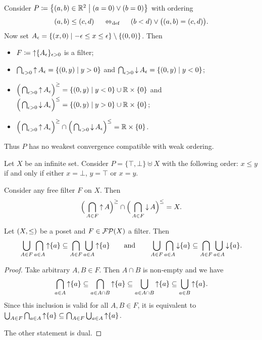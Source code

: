 \begin{example}
Consider $P \defeq \setbuilder{(a,b)\in \R^2}{(a=0)\lor (b=0)}$ with ordering
\[ (a,b) \leq (c,d) \;\quad\Leftrightarrow_{\text{def}}\quad\; (b<d) \lor \big((a,b) = (c,d)\big). \]
Now set $A_\epsilon = \setbuilder{(x, 0)}{-\epsilon \leq x\leq \epsilon} \setminus\{(0,0)\}$. Then
\begin{itemize}
\item $F \coloneqq \operatorname{\uparrow} \{A_\epsilon\}_{\epsilon > 0}$ is a filter;
\item $\bigcap_{\epsilon > 0}\upset A_\epsilon = \setbuilder{(0,y)}{y > 0}$ and $\bigcap_{\epsilon > 0}\downset A_\epsilon = \setbuilder{(0,y)}{y < 0}$;
\item $\Big(\bigcap_{\epsilon > 0}\upset A_\epsilon\Big)^\geq = \setbuilder{(0,y)}{y < 0}\cup \R\times\{0\}$ and $\Big(\bigcap_{\epsilon > 0}\downset A_\epsilon\Big)^\leq = \setbuilder{(0,y)}{y > 0}\cup \R\times\{0\}$;
\item $\Big(\bigcap_{\epsilon > 0}\operatorname{\uparrow} A_\epsilon\Big)^\geq \cap\Big(\bigcap_{\epsilon > 0}\operatorname{\downarrow} A_\epsilon\Big)^\leq = \mathbb{R}\times\{0\}$.
\end{itemize}
Thus $P$ has no weakest convergence compatible with weak ordering.
\end{example}

 

\begin{example}
Let $X$ be an infinite set. Consider $P = \{\top, \bot\}\uplus X$ with the following order: $x\leq y$ if and only if either $x = \bot$, $y = \top$ or $x = y$.

Consider any free filter $F$ on $X$. Then
\[ \Big(\bigcap_{A\in F}\operatorname{\uparrow} A\Big)^\geq \cap \Big(\bigcap_{A\in F}\operatorname{\downarrow} A\Big)^\leq = X. \]
\end{example}

\begin{lemma}
Let $\sSet{X,\leq}$ be a poset and $F\in \operatorname{\mathcal{FP}}(X)$ a filter. Then
\[ \bigcup_{A\in F}\bigcap_{a\in A}\operatorname{\uparrow}\{a\} \subseteq \bigcap_{A\in F}\bigcup_{a\in A}\operatorname{\uparrow}\{a\} \qquad\text{and}\qquad \bigcup_{A\in F}\bigcap_{a\in A}\operatorname{\downarrow}\{a\} \subseteq \bigcap_{A\in F}\bigcup_{a\in A}\operatorname{\downarrow}\{a\}. \]
\end{lemma}
\begin{proof}
Take arbitrary $A,B\in F$. Then $A\cap B$ is non-empty and we have
\[ \bigcap_{a\in A}\operatorname{\uparrow} \{a\} \subseteq \bigcap_{a\in A\cap B}\operatorname{\uparrow} \{a\} \subseteq \bigcup_{a\in A\cap B}\operatorname{\uparrow} \{a\} \subseteq \bigcup_{a\in B}\operatorname{\uparrow} \{a\}. \]
Since this inclusion is valid for all $A,B\in F$, it is equivalent to $\bigcup_{A\in F}\bigcap_{a\in A}\operatorname{\uparrow}\{a\} \subseteq \bigcap_{A\in F}\bigcup_{a\in A}\operatorname{\uparrow}\{a\}$.

The other statement is dual.
\end{proof}

